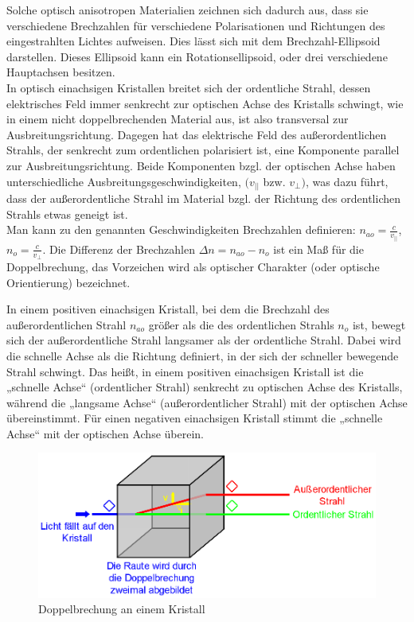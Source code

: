 \documentclass[12pt]{article}
\begin{document}
Solche optisch anisotropen Materialien zeichnen sich dadurch aus, dass sie verschiedene Brechzahlen für verschiedene Polarisationen und Richtungen des eingestrahlten Lichtes aufweisen. Dies lässt sich mit dem Brechzahl-Ellipsoid darstellen. Dieses Ellipsoid kann ein Rotationsellipsoid, oder drei verschiedene Hauptachsen besitzen. \\

In optisch einachsigen Kristallen breitet sich der ordentliche Strahl, dessen elektrisches Feld immer senkrecht zur optischen Achse des Kristalls schwingt, wie in einem nicht doppelbrechenden Material aus, ist also transversal zur Ausbreitungsrichtung. Dagegen hat das elektrische Feld des außerordentlichen Strahls, der senkrecht zum ordentlichen polarisiert ist, eine Komponente parallel zur Ausbreitungsrichtung. Beide Komponenten bzgl. der optischen Achse haben unterschiedliche Ausbreitungsgeschwindigkeiten, $(v_{||}$ bzw. $v_{\bot})$, was dazu führt, dass der außerordentliche Strahl im Material bzgl. der Richtung des ordentlichen Strahls etwas geneigt ist.\\

Man kann zu den genannten Geschwindigkeiten Brechzahlen definieren: $n_{ao} = \frac{c}{v_{||}}$, $n_o = \frac{c}{v_{\bot}}$. Die Differenz der Brechzahlen $\Delta n = n_{ao} - n_o$ ist ein Maß für die Doppelbrechung, das Vorzeichen wird als optischer Charakter (oder optische Orientierung) bezeichnet.

In einem positiven einachsigen Kristall, bei dem die Brechzahl des außerordentlichen Strahl $n_{ao}$ größer als die des ordentlichen Strahls $n_o$ ist, bewegt sich der außerordentliche Strahl langsamer als der ordentliche Strahl. Dabei wird die schnelle Achse als die Richtung definiert, in der sich der schneller bewegende Strahl schwingt. Das heißt, in einem positiven einachsigen Kristall ist die „schnelle Achse“ (ordentlicher Strahl) senkrecht zu optischen Achse des Kristalls, während die „langsame Achse“ (außerordentlicher Strahl) mit der optischen Achse übereinstimmt. Für einen negativen einachsigen Kristall stimmt die „schnelle Achse“ mit der optischen Achse überein. \\

\begin{figure}[H]
\centering
\includegraphics[width=1\linewidth]{pictures/doppelbrechung.eps}
\caption{Doppelbrechung an einem Kristall}
\end{figure}
\end{document}
